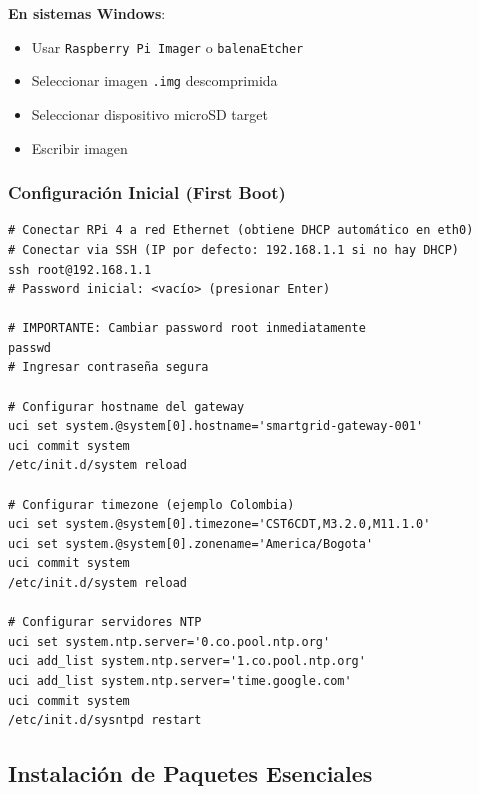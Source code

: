 \textbf{En sistemas Windows}:
\begin{itemize}
    \item Usar \texttt{Raspberry Pi Imager} o \texttt{balenaEtcher}
    \item Seleccionar imagen \texttt{.img} descomprimida
    \item Seleccionar dispositivo microSD target
    \item Escribir imagen
\end{itemize}

\subsubsection{Configuración Inicial (First Boot)}

\begin{verbatim}
# Conectar RPi 4 a red Ethernet (obtiene DHCP automático en eth0)
# Conectar via SSH (IP por defecto: 192.168.1.1 si no hay DHCP)
ssh root@192.168.1.1
# Password inicial: <vacío> (presionar Enter)

# IMPORTANTE: Cambiar password root inmediatamente
passwd
# Ingresar contraseña segura

# Configurar hostname del gateway
uci set system.@system[0].hostname='smartgrid-gateway-001'
uci commit system
/etc/init.d/system reload

# Configurar timezone (ejemplo Colombia)
uci set system.@system[0].timezone='CST6CDT,M3.2.0,M11.1.0'
uci set system.@system[0].zonename='America/Bogota'
uci commit system
/etc/init.d/system reload

# Configurar servidores NTP
uci set system.ntp.server='0.co.pool.ntp.org'
uci add_list system.ntp.server='1.co.pool.ntp.org'
uci add_list system.ntp.server='time.google.com'
uci commit system
/etc/init.d/sysntpd restart
\end{verbatim}

\subsection{Instalación de Paquetes Esenciales}

